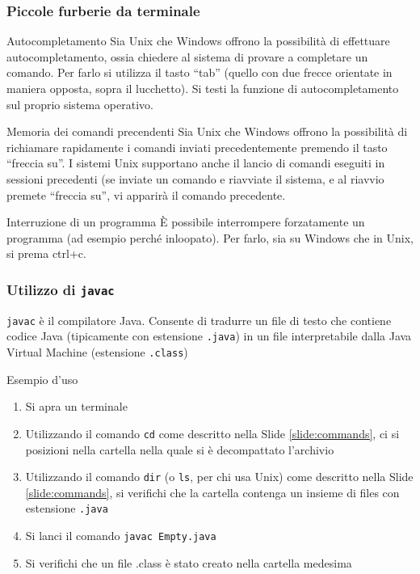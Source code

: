\documentclass{beamer}
\begin{document}
\begin{frame}[fragile]
\frametitle{Piccole furberie da terminale}
\begin{block}{Autocompletamento}
\scriptsize{}
Sia Unix che Windows offrono la possibilità di effettuare autocompletamento, ossia chiedere al sistema di provare a completare un comando. Per farlo si utilizza il tasto ``tab'' (quello con due frecce orientate in maniera opposta, sopra il lucchetto). Si testi la funzione di autocompletamento sul proprio sistema operativo.
\end{block}
\begin{block}{Memoria dei comandi precendenti}
\scriptsize{}
Sia Unix che Windows offrono la possibilità di richiamare rapidamente i comandi inviati precedentemente premendo il tasto ``freccia su''. I sistemi Unix supportano anche il lancio di comandi eseguiti in sessioni precedenti (se inviate un comando e riavviate il sistema, e al riavvio premete ``freccia su'', vi apparirà il comando precedente. 
\end{block}
\begin{block}{Interruzione di un programma}
\scriptsize{}
È possibile interrompere forzatamente un programma (ad esempio perché inloopato). Per farlo, sia su Windows che in Unix, si prema ctrl+c.
\end{block}
\end{frame}

\begin{frame}[fragile]
\frametitle{Utilizzo di \texttt{javac}}
\texttt{javac} è il compilatore Java. Consente di tradurre un file di testo che contiene codice Java (tipicamente con estensione \texttt{.java}) in un file interpretabile dalla Java Virtual Machine (estensione \texttt{.class})
\begin{block}{Esempio d'uso}
\begin{enumerate}
 \item Si apra un terminale
 \item Utilizzando il comando \texttt{cd} come descritto nella Slide \ref{slide:commands}, ci si posizioni nella cartella nella quale si è decompattato l'archivio
 \item Utilizzando il comando \texttt{dir} (o \texttt{ls}, per chi usa Unix) come descritto nella Slide \ref{slide:commands}, si verifichi che la cartella contenga un insieme di files con estensione \texttt{.java}
 \item Si lanci il comando \texttt{javac Empty.java}
 \item Si verifichi che un file .class è stato creato nella cartella medesima
\end{enumerate}
\end{block}
\end{frame}
\end{document}
